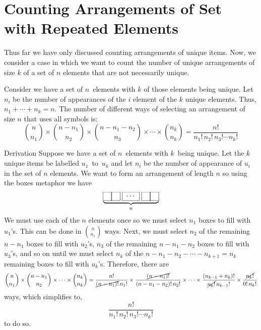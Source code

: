 \section{Counting Arrangements of Set with Repeated Elements}
Thus far we have only discussed counting arrangements of unique items. Now, we consider a case in which we want to count the number of unique arrangements of size $k$ of a set of $n$ elements that are not necessarily unique.
\par\smallskip
Consider we have a set of $n$~elements with $k$ of those elements being unique. Let $n_i$ be the number of appearances of the $i$ element of the $k$ unique elements. Thus, $n_1 + \cdots + n_k = n$. The number of different ways of selecting an arrangement of size $n$ that uses all symbols is:
\[
    \binom{n}{n_1} \times \binom{n - n_1}{n_2} \times \binom{n - n_1 - n_2}{n_3} \times \cdots \times \binom{n_k}{n_k} = \frac{n!}{n_1!\,n_2!\,n_3!\cdots n_k!}
\]
\begin{theory}{Derivation}
Suppose we have a set of $n$~elements with $k$~being unique. Let the $k$ unique items be labelled $u_1$~to~$u_k$ and let $n_i$ be the number of appearance of $u_i$ in the set of $n$ elements. We want to form an arrangement of length $n$ so using the boxes metaphor we have
\[\underbrace{\pboxes{0}}_n\]
We must use each of the $n$ elements once so we must select $n_1$ boxes to fill with $u_1$'s. This can be done in $\binom{n}{n_1}$ ways. Next, we must select $n_2$ of the remaining $n-n_1$ boxes to fill with $u_2$'s, $n_3$ of the remaining $n-n_1-n_2$ boxes to fill with $u_3$'s, and so on until we must select $n_k$ of the $n-n_1-n_2-\cdots-n_{k+1} = n_k$ remaining boxes to fill with $u_k$'s. Therefore, there are
\[
    \binom{n}{n_1} \times \binom{n - n_1}{n_2} \times \cdots \times \binom{n_k}{n_k} =
    \frac{n!}{\cancel{(n-n_1)!}\,n_1!} \times \frac{\cancel{(n-n_1)!}}{(n-n_1-n_2)!\,n_2!} \times \cdots \times \frac{(n_{k-1} + n_k)!}{\cancel{n_k!}\,n_{k-1}!} \times \frac{\cancel{n_k!}}{0!\,n_k!}
\]
ways, which simplifies to,
\[
    \frac{n!}{n_1!\,n_2!\,n_3!\cdots n_k!}
\]
to do so.
\end{theory}
